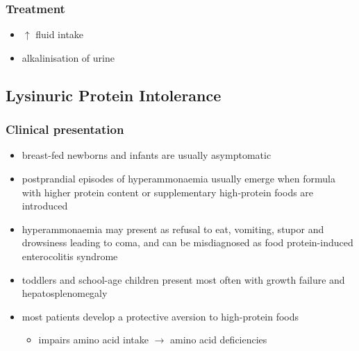 \documentclass{scrartcl}
\begin{document}
\subsubsection{Treatment}
\label{sec:org284593f}
\begin{itemize}
\item \(\uparrow\) fluid intake
\item alkalinisation of urine
\end{itemize}

\subsection{Lysinuric Protein Intolerance}
\label{sec:orgb7e861a}
\subsubsection{Clinical presentation}
\label{sec:orgd4e90d9}
\begin{itemize}
\item breast-fed newborns and infants are usually
asymptomatic
\item postprandial episodes of hyperammonaemia usually emerge when formula
with higher protein content or supplementary high-protein foods are
introduced
\item hyperammonaemia may present as refusal to eat, vomiting, stupor and
drowsiness leading to coma, and can be misdiagnosed as food
protein-induced enterocolitis syndrome
\item toddlers and school-age children present most often with growth
failure and hepatosplenomegaly
\item most patients develop a protective aversion to high-protein foods
\begin{itemize}
\item impairs amino acid intake \(\to\) amino acid deficiencies
\end{itemize}
\end{itemize}
\end{document}
